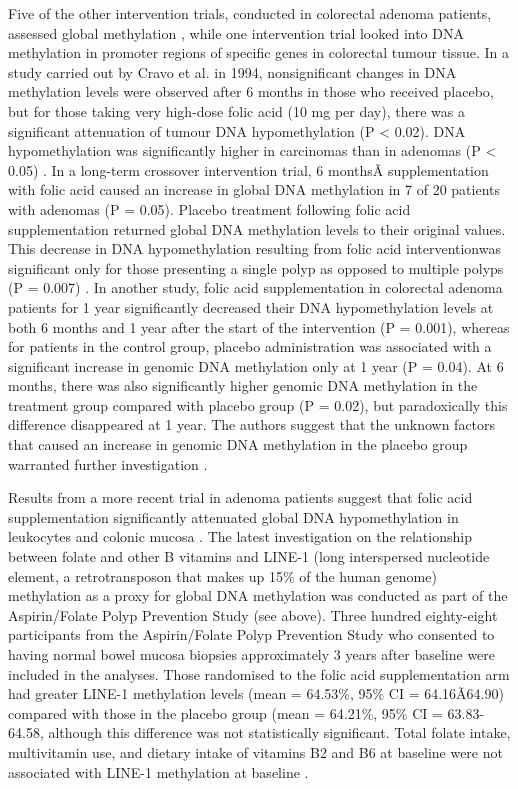 \noindent Five of the other intervention trials, conducted in colorectal adenoma patients, assessed global methylation \cite{c253,c257}, while one intervention trial looked into DNA methylation in promoter regions of specific genes \cite{c258} in colorectal tumour tissue. In a study carried out by Cravo et al. in 1994, nonsignificant changes in DNA methylation levels were observed after 6 months in those who received placebo, but for those taking very high-dose folic acid (10 mg per day), there was a significant attenuation of tumour DNA hypomethylation (P < 0.02). DNA hypomethylation was significantly higher in carcinomas than in adenomas (P < 0.05) \cite{c253}. In a long-term crossover intervention trial, 6 monthsÃ supplementation with folic acid caused an increase in global DNA methylation in 7 of 20 patients with adenomas (P = 0.05). Placebo treatment following folic acid supplementation returned global DNA methylation levels to their original values. This decrease in DNA hypomethylation resulting from 
folic acid interventionwas significant only for those presenting a single polyp as opposed to multiple polyps (P = 0.007) \cite{c254}. In another study, folic acid supplementation in colorectal adenoma patients for 1 year significantly decreased their DNA hypomethylation levels at both 6 months and 1 year after the start of the intervention (P = 0.001), whereas for patients in the control group, placebo administration was associated with a significant increase in genomic DNA methylation only at 1 year (P = 0.04). At 6 months, there was also significantly higher genomic DNA methylation in the treatment group compared with placebo group (P = 0.02), but paradoxically this difference disappeared at 1 year. The authors suggest that the unknown factors that caused an increase in genomic DNA methylation in the placebo group warranted further investigation \cite{c255}. 
 
\noindent Results from a more recent trial in adenoma patients suggest that folic acid supplementation significantly attenuated global DNA hypomethylation in leukocytes and colonic mucosa \cite{c256}. The latest investigation on the relationship between folate and other B vitamins and LINE-1 (long interspersed nucleotide element, a retrotransposon that makes up 15\% of the human genome) methylation as a proxy for global DNA methylation was conducted as part of the Aspirin/Folate Polyp Prevention Study (see above). Three hundred eighty-eight participants from the Aspirin/Folate Polyp Prevention Study who consented to having normal bowel mucosa biopsies approximately 3 years after baseline were included in the analyses. Those randomised to the folic acid supplementation arm had greater LINE-1 methylation levels (mean = 64.53\%, 95\% CI = 64.16Ã64.90) compared with those in the placebo group (mean = 64.21\%, 95\% CI = 63.83-64.58, although this difference was not statistically significant. Total folate intake, 
multivitamin use, and dietary intake of vitamins B2 and B6 at baseline were not associated with LINE-1 methylation at baseline \cite{c257}. 

